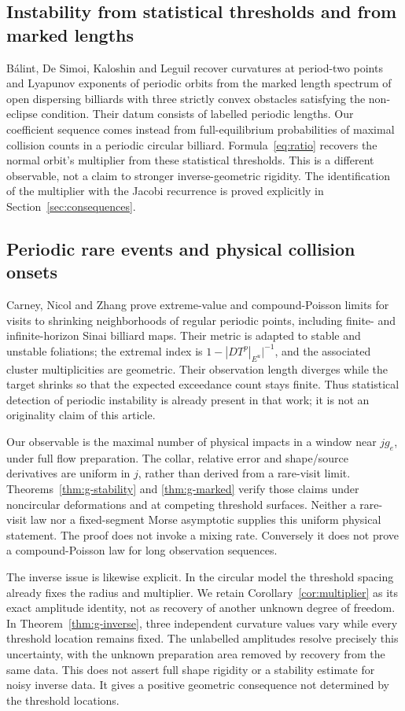 \subsection{Instability from statistical thresholds and from marked lengths}
B\'alint, De Simoi, Kaloshin and Leguil \cite{BDKL} recover curvatures at
period-two points and Lyapunov exponents of periodic orbits from the marked
length spectrum of open dispersing billiards with three strictly convex
obstacles satisfying the non-eclipse condition. Their datum consists of
labelled periodic lengths. Our coefficient sequence comes instead from
full-equilibrium probabilities of maximal collision counts in a periodic
circular billiard. Formula~\eqref{eq:ratio} recovers the normal
orbit's multiplier from these statistical thresholds. This is a different
observable, not a claim to stronger inverse-geometric rigidity. The
identification of the multiplier with the Jacobi recurrence is proved
explicitly in Section~\ref{sec:consequences}.


\subsection{Periodic rare events and physical collision onsets}
Carney, Nicol and Zhang \cite[Theorems 1--2]{CNZ} prove extreme-value
and compound-Poisson limits for visits to shrinking neighborhoods of
regular periodic points, including finite- and infinite-horizon Sinai
billiard maps. Their metric is adapted to stable and unstable foliations;
the extremal index is $1-|DT^p|_{E^u}|^{-1}$, and the associated
cluster multiplicities are geometric. Their observation length diverges
while the target shrinks so that the expected exceedance count stays
finite. Thus statistical detection of periodic instability is already
present in that work; it is not an originality claim of this article.

Our observable is the maximal number of physical impacts in a window
near $jg_e$, under full flow preparation. The collar, relative error and
shape/source derivatives are uniform in $j$, rather than derived from
a rare-visit limit. Theorems~\ref{thm:g-stability} and
\ref{thm:g-marked} verify those claims under noncircular deformations
and at competing threshold surfaces. Neither a rare-visit law nor a
fixed-segment Morse asymptotic supplies this uniform physical statement.
The proof does not invoke a mixing rate. Conversely it does not prove
a compound-Poisson law for long observation sequences.

The inverse issue is likewise explicit. In the circular model the
threshold spacing already fixes the radius and multiplier. We retain
Corollary~\ref{cor:multiplier} as its exact amplitude identity, not as
recovery of another unknown degree of freedom. In
Theorem~\ref{thm:g-inverse}, three independent curvature values vary
while every threshold location remains fixed. The unlabelled amplitudes
resolve precisely this uncertainty, with the unknown preparation area
removed by recovery from the same data. This does not assert full shape
rigidity or a stability estimate for noisy inverse data. It gives a
positive geometric consequence not determined by the threshold locations.

